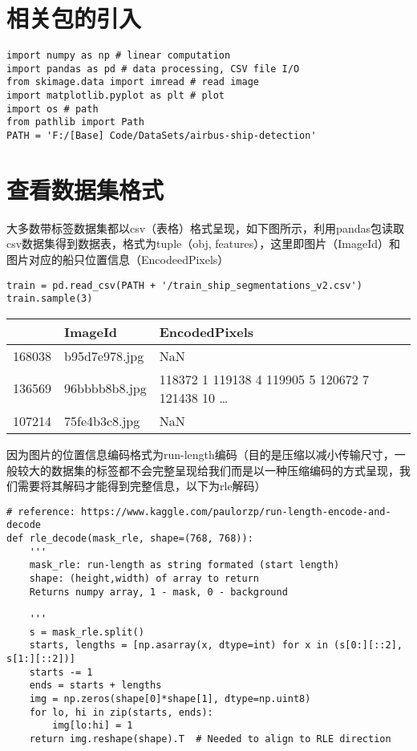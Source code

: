 \section{相关包的引入}\label{ux76f8ux5173ux5305ux7684ux5f15ux5165}

\begin{lstlisting}
import numpy as np # linear computation
import pandas as pd # data processing, CSV file I/O
from skimage.data import imread # read image
import matplotlib.pyplot as plt # plot
import os # path
from pathlib import Path
PATH = 'F:/[Base] Code/DataSets/airbus-ship-detection'
\end{lstlisting}

\section{查看数据集格式}\label{ux67e5ux770bux6570ux636eux96c6ux683cux5f0f}

大多数带标签数据集都以csv（表格）格式呈现，如下图所示，利用pandas包读取csv数据集得到数据表，格式为tuple（obj,
features），这里即图片（ImageId）和图片对应的船只位置信息（EncodeedPixels）

\begin{lstlisting}
train = pd.read_csv(PATH + '/train_ship_segmentations_v2.csv')
train.sample(3)
\end{lstlisting}

\begin{longtable}[]{@{}lll@{}}
\toprule
& ImageId & EncodedPixels\tabularnewline
\midrule
\endhead
168038 & b95d7e978.jpg & NaN\tabularnewline
136569 & 96bbbb8b8.jpg & 118372 1 119138 4 119905 5 120672 7 121438 10
\ldots{}\tabularnewline
107214 & 75fe4b3c8.jpg & NaN\tabularnewline
\bottomrule
\end{longtable}

因为图片的位置信息编码格式为run-length编码（目的是压缩以减小传输尺寸，一般较大的数据集的标签都不会完整呈现给我们而是以一种压缩编码的方式呈现，我们需要将其解码才能得到完整信息，以下为rle解码）

\begin{lstlisting}
# reference: https://www.kaggle.com/paulorzp/run-length-encode-and-decode
def rle_decode(mask_rle, shape=(768, 768)):
    '''
    mask_rle: run-length as string formated (start length)
    shape: (height,width) of array to return 
    Returns numpy array, 1 - mask, 0 - background

    '''
    s = mask_rle.split()
    starts, lengths = [np.asarray(x, dtype=int) for x in (s[0:][::2], s[1:][::2])]
    starts -= 1
    ends = starts + lengths
    img = np.zeros(shape[0]*shape[1], dtype=np.uint8)
    for lo, hi in zip(starts, ends):
        img[lo:hi] = 1
    return img.reshape(shape).T  # Needed to align to RLE direction
\end{lstlisting}

